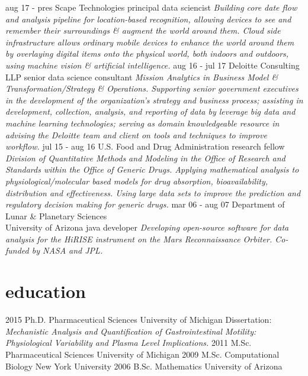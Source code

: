 \documentclass[10pt,twoside]{friggeri-cv}
\begin{document}
\begin{entrylist}
  \entry
    {\scriptsize aug 17 - pres}
    {Scape Technologies}
    {principal data sciencist}
    {\scriptsize \emph{Building core date flow and analysis pipeline for location-based recognition, allowing devices to see and remember their surroundings \& augment the world around them. Cloud side infrastructure allows ordinary mobile devices to enhance the world around them by overlaying digital items onto the physical world, both indoors and outdoors, using machine vision \& artificial intelligence.}}
  \entry
    {\scriptsize aug 16 - jul 17}
    {Deloitte Consulting LLP}
    {senior data science consultant}
    {\scriptsize \emph{Mission Analytics in Business Model \& Transformation/Strategy \& Operations. Supporting senior government executives in the development of the organization's strategy and business process; assisting in development, collection, analysis, and reporting of data by leverage big data and machine learning technologies; serving as domain knowledgeable resource in advising the Deloitte team and client on tools and techniques to improve workflow.}}
  \entry
    {\scriptsize jul 15 - aug 16}
    {U.S. Food and Drug Administration}
    {research fellow}
    {\scriptsize \emph{Division of Quantitative Methods and Modeling in the Office of Research and Standards within the Office of Generic Drugs. 
Applying mathematical analysis to physiological/molecular based models for drug absorption, bioavailability, distribution and effectiveness. Using large data sets to improve the prediction and regulatory decision making for generic drugs.}}
  \entry
    {\scriptsize mar 06 - aug 07}
    {Department of Lunar \& Planetary Sciences\\University of Arizona}
    {java developer}
    {\scriptsize \emph{Developing open-source software for data analysis for the HiRISE instrument on the Mars Reconnaissance Orbiter. Co-funded by NASA and JPL.}}
\end{entrylist}

\pagebreak
    
\section{education}

\begin{entrylist}
  \entry
    {\scriptsize 2015}
    {Ph.D. {\normalfont Pharmaceutical Sciences}}
    {University of Michigan}
    {\scriptsize Dissertation: \emph{Mechanistic Analysis and Quantification of Gastrointestinal Motility: Physiological Variability and Plasma Level Implications.}}
  \entry
    {\scriptsize 2011}
    {M.Sc. {\normalfont Pharmaceutical Sciences}}
    {University of Michigan}
    {}
  \entry
    {\scriptsize 2009}
    {M.Sc. {\normalfont Computational Biology}}
    {New York University}
    {}
  \entry
    {\scriptsize 2006}
    {B.Sc. {\normalfont Mathematics}}
    {University of Arizona}
    {}
  \end{entrylist}
  
\end{document}
